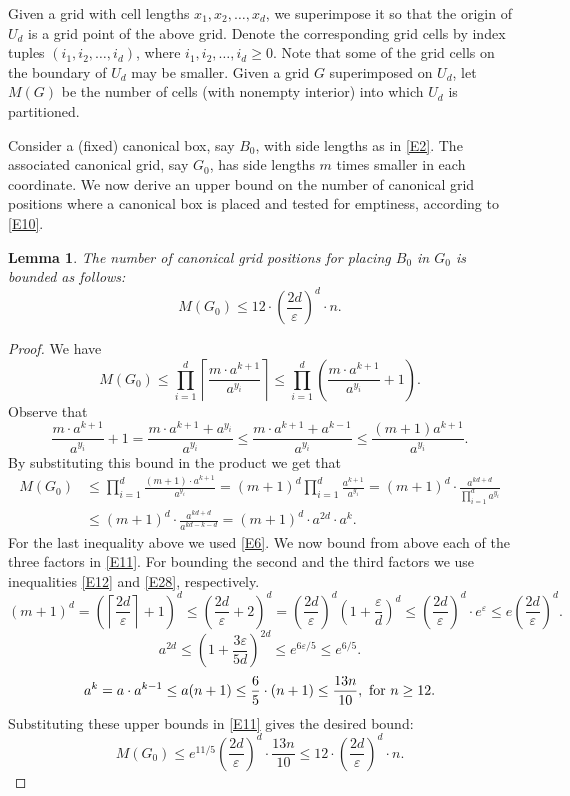 \documentclass[11pt]{article}
\newtheorem{lemma}{Lemma}
\newcommand{\eps}{\varepsilon}
\begin{document}
Given a grid with cell lengths $x_1,x_2,\ldots,x_d$, we superimpose it so that the
origin of $U_d$ is a grid point of the above grid. Denote the
corresponding grid cells by index tuples $(i_1,i_2,\ldots,i_d)$, 
where $i_1,i_2,\ldots,i_d \geq 0$. 
Note that some of the grid cells on the boundary of $U_d$ may be
smaller. Given a grid $G$ superimposed on $U_d$, let $M(G)$ be the
number of cells (with nonempty interior) into which $U_d$ is partitioned. 

Consider a (fixed) canonical box, say $B_0$,  with side lengths as in
\eqref{E2}. The associated canonical grid, say $G_0$, has side lengths
$m$ times smaller in each coordinate. 
We now derive an upper bound on the number of canonical
grid positions where a canonical box is placed and tested for emptiness,
according to \eqref{E10}. 

\begin{lemma} \label{L10}
The number of canonical grid positions for placing $B_0$ in $G_0$ is
bounded as follows: 
$$ M(G_0) \leq 12 \cdot \left( \frac{2d}{\eps} \right)^d \cdot n. $$
\end{lemma}
\begin{proof}
We have
$$ M(G_0) \leq 
\prod_{i=1}^d \left \lceil \frac{m \cdot a^{k+1}}{a^{y_i}} \right \rceil \leq
\prod_{i=1}^d \left(\frac{m \cdot a^{k+1}}{a^{y_i}} +1 \right). 
$$
Observe that
$$ \frac{m \cdot a^{k+1}}{a^{y_i}} +1 = 
\frac{m \cdot a^{k+1}+a^{y_i} }{a^{y_i}} \leq 
\frac{m \cdot a^{k+1}+a^{k-1} }{a^{y_i}} \leq 
\frac{(m+1) a^{k+1}}{a^{y_i}}. 
$$
By substituting this bound in the product we get that
\begin{align} \label{E11}
M(G_0) &\leq \prod_{i=1}^d \frac{(m+1) \cdot a^{k+1}}{a^{y_i}} =
(m+1)^d \prod_{i=1}^d \frac{a^{k+1}}{a^{y_i}} = 
(m+1)^d \cdot \frac{a^{kd+d}}{\prod_{i=1}^d a^{y_i}} \nonumber \\
&\leq (m+1)^d \cdot \frac{a^{kd+d}}{a^{kd-k-d}} = 
(m+1)^d \cdot a^{2d} \cdot a^k. 
\end{align} 
For the last inequality above we used \eqref{E6}.
We now bound from above each of the three factors in \eqref{E11}.
For bounding the second and the third factors we use inequalities
\eqref{E12} and \eqref{E28}, respectively.
$$ (m+1)^d = \left( \left \lceil \frac{2d}{\eps} \right \rceil+1\right) ^d \leq
\left( \frac{2d}{\eps} +2 \right)^d = 
\left( \frac{2d}{\eps} \right)^d \left( 1+ \frac{\eps}{d} \right)^d \leq
\left( \frac{2d}{\eps} \right)^d \cdot e^{\eps} \leq
e \left( \frac{2d}{\eps} \right)^d. $$
$$  a^{2d} \leq \left(1+ \frac{3\eps}{5d} \right)^{2d} \leq
e^{6\eps/5} \leq e^{6/5}. $$
$$ a^k = a \cdot a^{k-1} \leq  a(n+1) \leq \frac{6}{5} \cdot (n+1)
\leq \frac{13n}{10}, {\rm \ for \ } n \geq 12. $$
Substituting these upper bounds in \eqref{E11} gives the desired bound:
$$ M(G_0) \leq e^{11/5} \left( \frac{2d}{\eps} \right)^d \cdot \frac{13n}{10} \leq
12 \cdot \left( \frac{2d}{\eps} \right)^d \cdot n. 
$$

\vspace{-2\baselineskip}
\end{proof}
\end{document}
